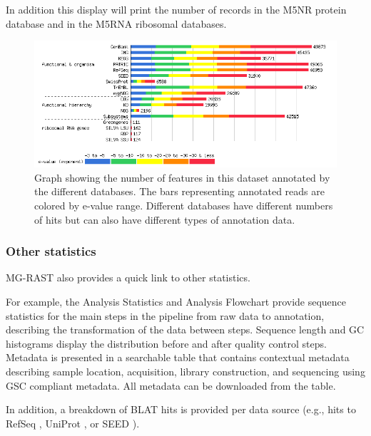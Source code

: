\documentclass[12pt,fullpage]{report}
\begin{document}
In addition this display will print the number of records in the M5NR protein database and in the M5RNA ribosomal databases. 

\begin{figure}
\begin{center}
\includegraphics[width=6in]{Images/source-hits-distribution.png}
\end{center}
\caption{Graph showing the number of features in this dataset annotated by the different databases.
 The bars representing annotated reads are colored by e-value range. Different databases have different numbers of hits but can also have different types of annotation data.}
\label{fig:source-hits-distribution}
\end{figure}

\subsubsection{Other statistics }

MG-RAST also provides a quick link to
other statistics.


For example, the Analysis Statistics and Analysis Flowchart provide sequence statistics for the main steps in the pipeline from raw data to annotation, describing the transformation of the data between steps.
Sequence length and GC histograms display the distribution before and after quality control steps.
Metadata is presented in a searchable table that contains contextual metadata describing sample location, acquisition, library construction, and sequencing using GSC compliant metadata. All metadata can be downloaded from the table.

In addition, 
a breakdown of BLAT hits is provided  per data source (e.g., hits to RefSeq \cite{REFSEQ}, UniProt \cite{UNIPROT}, or \gls{SEED} \cite{SUBSYSTEMS}).
\end{document}
